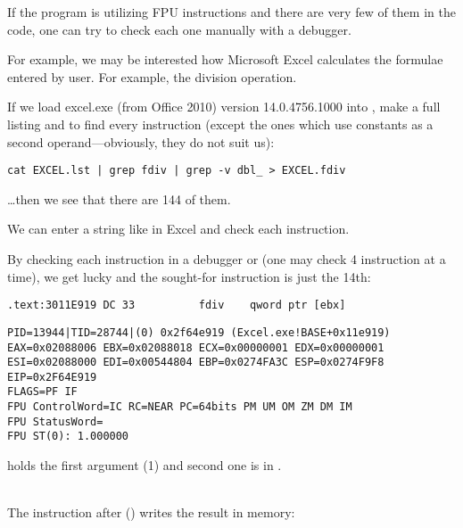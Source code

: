 
If the program is utilizing FPU instructions and there are very few of them in the code,
one can try to check each one manually with a debugger.

\par For example, we may be interested how Microsoft Excel calculates the formulae entered by user.
For example, the division operation.

\myindex{\GrepUsage}

If we load excel.exe (from Office 2010) version 14.0.4756.1000 into \IDA, make a full listing
and to find every \FDIV instruction (except the ones which use constants as a second 
operand---obviously, they do not suit us):

\begin{lstlisting}
cat EXCEL.lst | grep fdiv | grep -v dbl_ > EXCEL.fdiv
\end{lstlisting}

\dots then we see that there are 144 of them.

\par We can enter a string like  in Excel and check each instruction.


\par By checking each instruction in a debugger or \tracer
(one may check 4 instruction at a time),
we get lucky and the sought-for instruction is just the 14th:

\begin{lstlisting}[style=customasmx86]
.text:3011E919 DC 33          fdiv    qword ptr [ebx]
\end{lstlisting}

\begin{lstlisting}
PID=13944|TID=28744|(0) 0x2f64e919 (Excel.exe!BASE+0x11e919)
EAX=0x02088006 EBX=0x02088018 ECX=0x00000001 EDX=0x00000001
ESI=0x02088000 EDI=0x00544804 EBP=0x0274FA3C ESP=0x0274F9F8
EIP=0x2F64E919
FLAGS=PF IF
FPU ControlWord=IC RC=NEAR PC=64bits PM UM OM ZM DM IM 
FPU StatusWord=
FPU ST(0): 1.000000
\end{lstlisting}

 holds the first argument (1) and second one is in \TT{[EBX]}.\\
\\

The instruction after \FDIV () writes the result in memory:\\

